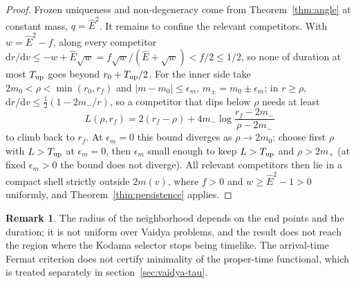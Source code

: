 \documentclass[aip,jmp,amsmath,amssymb,reprint]{revtex4-2}
\newcommand{\Ehat}{\hat E}
\newcommand{\dd}{\mathrm{d}}
\theoremstyle{plain}
\theoremstyle{definition}
\newtheorem{remark}[proposition]{Remark}
\begin{document}
\begin{proof}
Frozen uniqueness and non-degeneracy come from Theorem~\ref{thm:angle} at constant mass, $q=\Ehat^2$. It remains to
confine the relevant competitors. With $w=\Ehat^2-f$, along every competitor
$\dd r/\dd v\le-w+\Ehat\sqrt w=f\sqrt w/(\Ehat+\sqrt w)<f/2\le1/2$, so none of duration at
most $T_{\rm up}$ goes beyond $r_0+T_{\rm up}/2$. For the inner side take
$2m_0<\rho<\min(r_0,r_f)$ and $|m-m_0|\le\epsilon_m$, $m_\pm=m_0\pm\epsilon_m$; in $r\ge\rho$,
$\dd r/\dd v\le\frac12(1-2m_-/r)$, so a competitor that dips below $\rho$ needs at least
\[
  L(\rho,r_f)=2(r_f-\rho)+4m_-\log\frac{r_f-2m_-}{\rho-2m_-}
\]
to climb back to $r_f$. At $\epsilon_m=0$ this bound diverges as $\rho\to2m_0$: choose first $\rho$
with $L>T_{\rm up}$ at $\epsilon_m=0$, then $\epsilon_m$ small enough to keep $L>T_{\rm up}$ and
$\rho>2m_+$ (at fixed $\epsilon_m>0$ the bound does not diverge). All relevant competitors then lie in a compact shell strictly outside
$2m(v)$, where $f>0$ and $w\ge\Ehat^2-1>0$ uniformly, and Theorem~\ref{thm:persistence}
applies.
\end{proof}

\begin{remark}
The radius of the neighborhood depends on the end points and the duration; it is not
uniform over Vaidya problems, and the result does not reach the region where the Kodama
selector stops being timelike. The arrival-time Fermat criterion does not certify minimality
of the proper-time functional, which is treated separately in section~\ref{sec:vaidya-tau}.
\end{remark}

\end{document}
